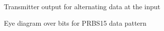 \begin{figure}[H]
  \centering
  \caption{Transmitter output for alternating data at the input}
  \label{fig:alternating_data}
\end{figure}

\begin{figure}[H]
  \centering
  \caption{Eye diagram over \unit[10000]{bits} for PRBS15 data pattern}
  \label{fig:eye_prbs15}
\end{figure}

